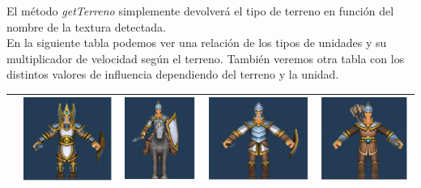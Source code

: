 El método \textit{getTerreno} simplemente devolverá el tipo de terreno en función del nombre de la textura detectada.\\

En la siguiente tabla podemos ver una relación de los tipos de unidades y su multiplicador de velocidad según el terreno. También veremos otra tabla con los distintos valores de influencia dependiendo del terreno y la unidad.

\begin{table}[H]
    \centering
    \begin{tabular}{|c|c|c|c|c|}
        \cline{2-5}        
        \multicolumn{1}{c|}{} & \includegraphics{imagesTable/infanteria} & \includegraphics{imagesTable/caballo} & \includegraphics{imagesTable/lancero} & \includegraphics{imagesTable/arquero} \\
        \hline

\end{tabular}
\end{table}
